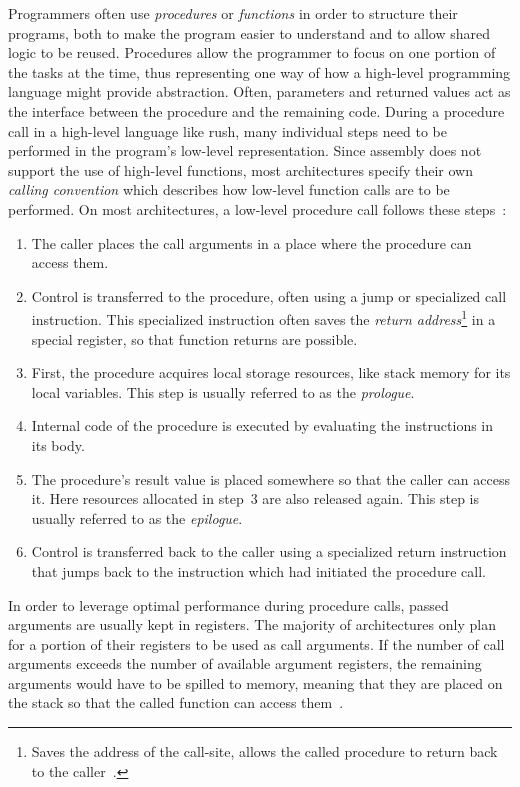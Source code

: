 Programmers often use \emph{procedures} or \emph{functions} in order to structure their programs,
both to make the program easier to understand and to allow shared logic to be reused.
Procedures allow the programmer to focus on one portion of the tasks at the time,
thus representing one way of how a high-level programming language might provide abstraction.
Often, parameters and returned values act as the interface between the procedure and the remaining code.
During a procedure call in a high-level language like rush, many individual steps need to be performed in the program's low-level representation.
Since assembly does not support the use of high-level functions, most architectures specify their own \emph{calling convention} which describes how low-level function calls are to be performed.
On most architectures, a low-level procedure call follows these steps~\cite[p.~98]{Patterson2017-zq}:

\begin{enumerate}
	\item The caller places the call arguments in a place where the procedure can access them.
	\item Control is transferred to the procedure, often using a jump or specialized call instruction.
	      This specialized instruction often saves the \emph{return address}\footnote{Saves the address of the call-site,
		      allows the called procedure to return back to the caller~\cite[p.~99]{Patterson2017-zq}.} in a special register, so that function returns are possible.
	\item First, the procedure acquires local storage resources, like stack memory for its local variables.
	      This step is usually referred to as the \emph{prologue}.
	\item Internal code of the procedure is executed by evaluating the instructions in its body.
	\item The procedure's result value is placed somewhere so that the caller can access it.
	      Here resources allocated in step~3 are also released again.
	      This step is usually referred to as the \emph{epilogue}.
	\item Control is transferred back to the caller using a specialized return instruction
	      that jumps back to the instruction which had initiated the procedure call.
\end{enumerate}

In order to leverage optimal performance during procedure calls, passed arguments are usually kept in registers.
The majority of architectures only plan for a portion of their registers to be used as call arguments.
If the number of call arguments exceeds the number of available argument registers, the remaining arguments would have to be spilled to memory, meaning that they are placed on the stack so that the called function can access them~\cite[p.~98]{Patterson2017-zq}.

